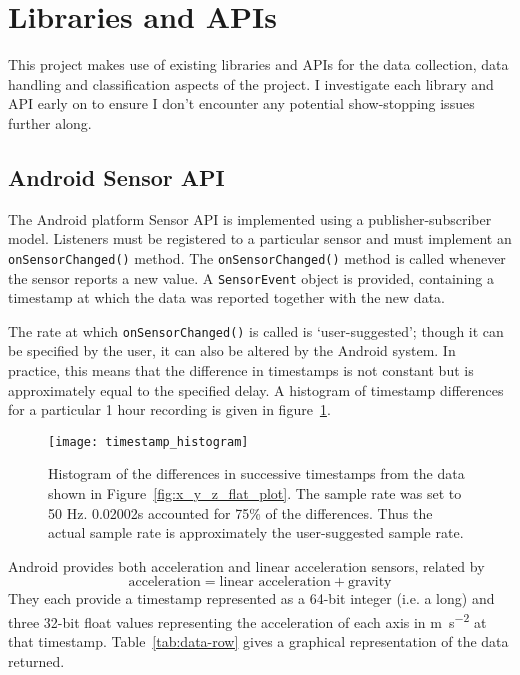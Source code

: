   
  \section{Libraries and APIs}
      This project makes use of existing libraries and APIs for the data collection, data handling
      and classification aspects of the project. I investigate each library and API early on to ensure I don't encounter any potential show-stopping issues further along. 
    
    \subsection{Android Sensor API}
      \label{sec:sensor-api}
      The Android platform Sensor API\cite{androidsensoreventapi} is implemented using a publisher-subscriber model. Listeners must be registered
      to a particular sensor and must implement an \texttt{onSensorChanged()}
      method. The \texttt{onSensorChanged()} method is called whenever the sensor reports a new 
      value. A \texttt{SensorEvent} object is provided, containing a timestamp at which the data was
      reported together with the new data.
      
      The rate at which \texttt{onSensorChanged()} is called is `user-suggested'; though it can be 
      specified by the user, it can also be altered by the Android system. In practice, this means
      that the difference in timestamps is not constant but is approximately equal to the specified 
      delay. A histogram of timestamp differences for a particular 1 hour recording is given in 
      figure~\ref{fig:timestamp-differences}.
      
      \begin{figure}[h]
        \centering
        \texttt{[image: timestamp\_histogram]}
        \caption[Histogram of the differences in successive timestamps]{Histogram of the differences in successive timestamps from the data shown in Figure~\ref{fig:x_y_z_flat_plot}. 
            The sample rate was set to 50 \si{Hz}. 0.02002s accounted for 75\% of the 
            differences.
            Thus the actual sample rate is approximately the user-suggested sample rate.}
        \label{fig:timestamp-differences}
      \end{figure}
      
      Android provides both acceleration and linear acceleration sensors, related by 
      $$\textrm{acceleration} = \textrm{linear acceleration} + \textrm{gravity}$$
      They each provide a timestamp represented as a 64-bit integer (i.e. a long) and three 32-bit float values representing the 
      acceleration of each axis in \si{\metre\per\square\second} at that timestamp.   
      Table~\ref{tab:data-row} gives a graphical representation of the data returned.
      

